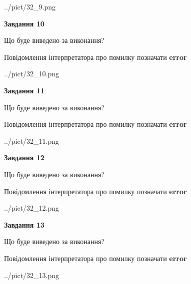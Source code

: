 \documentclass[11pt, ukrainian]{article}
\begin{document}
{\begin {large}
\begin{center}
	{../pict/32_9.png}
\end{center}
\newpage

{\begin {center}\textbf{Завдання 10}\end {center}}\par
Що буде виведено за виконання? \par
Повідомлення інтерпретатора про помилку позначати \textbf{error}

\begin{center}
	{../pict/32_10.png}
\end{center}
\newpage

{\begin {center}\textbf{Завдання 11}\end {center}}\par
Що буде виведено за виконання? \par
Повідомлення інтерпретатора про помилку позначати \textbf{error}

\begin{center}
	{../pict/32_11.png}
\end{center}
\newpage

{\begin {center}\textbf{Завдання 12}\end {center}}\par
Що буде виведено за виконання? \par
Повідомлення інтерпретатора про помилку позначати \textbf{error}

\begin{center}
	{../pict/32_12.png}
\end{center}
\newpage

{\begin {center}\textbf{Завдання 13}\end {center}}\par
Що буде виведено за виконання? \par
Повідомлення інтерпретатора про помилку позначати \textbf{error}

\begin{center}
	{../pict/32_13.png}
\end{center}
\newpage


\end{large}}
\end{document}
